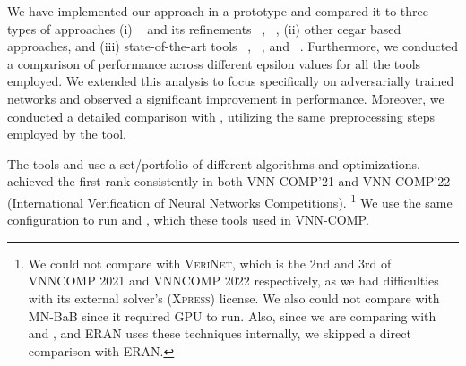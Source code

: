 We have implemented our approach in a prototype and compared it to three types of approaches 
(i) \deeppoly{}~\cite{singh2019abstract} and its refinements \kpoly{}~\cite{singh2019beyond}, \deepsrgr{}~\cite{yang2021improving}, 
(ii) other cegar based approaches, and 
(iii) state-of-the-art tools \alphabeta~\cite{zhang2018efficient,wang2021beta,xu2020fast,zhang2022branch,tjeng2017evaluating}, 
\ovaltool~\cite{bunel2018unified,bunel2020branch,bunel2020lagrangian,de2021scaling,de2021scaling,de2021scaling2,de2021improved}, 
and \marabou~\cite{katz2019marabou}. 
Furthermore, we conducted a comparison of performance across different epsilon values for all the tools employed. 
We extended this analysis to focus specifically on adversarially trained networks and observed a significant improvement 
in performance. Moreover, we conducted a detailed comparison with \alphabeta{}, 
utilizing the same preprocessing steps employed by the \alphabeta{} tool.

The tools \alphabeta{} and \ovaltool{} use a set/portfolio of different algorithms and optimizations. \alphabeta{} achieved the first rank consistently in both 
VNN-COMP'21 and VNN-COMP'22 (International Verification of Neural Networks Competitions). %
\footnote{We could not compare with \textsc{VeriNet}, which is the 2nd and 3rd of VNNCOMP 2021 and VNNCOMP 2022 respectively, as we had difficulties with its external solver's (\textsc{Xpress}) license. We also
could not compare with MN-BaB since it required GPU to run.  
Also, since we are comparing with \deeppoly{} and \kpoly{}, and \textsc{ERAN} uses these techniques internally, we skipped a direct comparison with \textsc{ERAN}.}%
We use the same configuration to run \alphabeta{} and \ovaltool{}, which these tools used in VNN-COMP.

